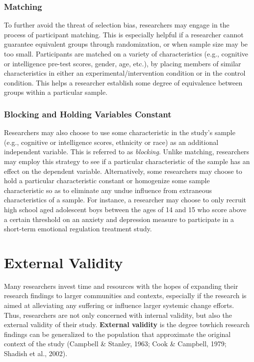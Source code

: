 \documentclass[
  11pt,
]{book}
\begin{document}
\hypertarget{matching}{%
\subsubsection{Matching}\label{matching}}

To further avoid the threat of selection bias, researchers may engage in the process of participant matching. This is especially helpful if a researcher cannot guarantee equivalent groups through randomization, or when sample size may be too small. Participants are matched on a variety of characteristics (e.g., cognitive or intelligence pre-test scores, gender, age, etc.), by placing members of similar characteristics in either an experimental/intervention condition or in the control condition. This helps a researcher establish some degree of equivalence between groups within a particular sample.

\hypertarget{blocking-and-holding-variables-constant}{%
\subsubsection{Blocking and Holding Variables Constant}\label{blocking-and-holding-variables-constant}}

Researchers may also choose to use some characteristic in the study's sample (e.g., cognitive or intelligence scores, ethnicity or race) as an additional independent variable. This is referred to as \emph{blocking}. Unlike matching, researchers may employ this strategy to see if a particular characteristic of the sample has an effect on the dependent variable. Alternatively, some researchers may choose to hold a particular characteristic constant or homogenize some sample characteristic so as to eliminate any undue influence from extraneous characteristics of a sample. For instance, a researcher may choose to only recruit high school aged adolescent boys between the ages of 14 and 15 who score above a certain threshold on an anxiety and depression measure to participate in a short-term emotional regulation treatment study.

\hypertarget{external-validity}{%
\section{External Validity}\label{external-validity}}

Many researchers invest time and resources with the hopes of expanding their research findings to larger communities and contexts, especially if the research is aimed at alleviating any suffering or influence larger systemic change efforts. Thus, researchers are not only concerned with internal validity, but also the external validity of their study. \textbf{External validity} is the degree towhich research findings can be generalized to the population that approximate the original context of the study (Campbell \& Stanley, 1963; Cook \& Campbell, 1979; Shadish et al., 2002).
\end{document}
